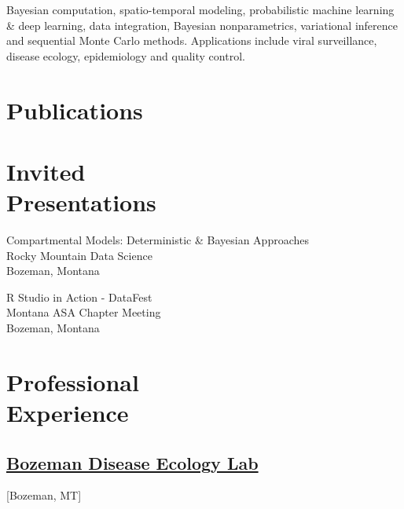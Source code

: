 \documentclass{wm_cv}
\begin{document}
Bayesian computation, spatio-temporal modeling, probabilistic machine learning \& deep learning, data integration, Bayesian nonparametrics, variational inference and sequential Monte Carlo methods. Applications include viral surveillance, disease ecology, epidemiology and quality control. 

\section{Publications}%


\section{Invited \\ Presentations}

Compartmental Models: Deterministic \& Bayesian Approaches \\ 
    \indent \quad Rocky Mountain Data Science \hfill {} \\
   \indent \quad Bozeman, Montana
   
R Studio in Action - DataFest\\ 
    \indent \quad Montana ASA Chapter Meeting \hfill {} \\
   \indent \quad Bozeman, Montana

\section{Professional \\ Experience}
\subsection{\href{http://bzndiseaselab.org/}{Bozeman Disease Ecology Lab}}[Bozeman, MT]
\begin{positions}
\end{positions}
\end{document}
